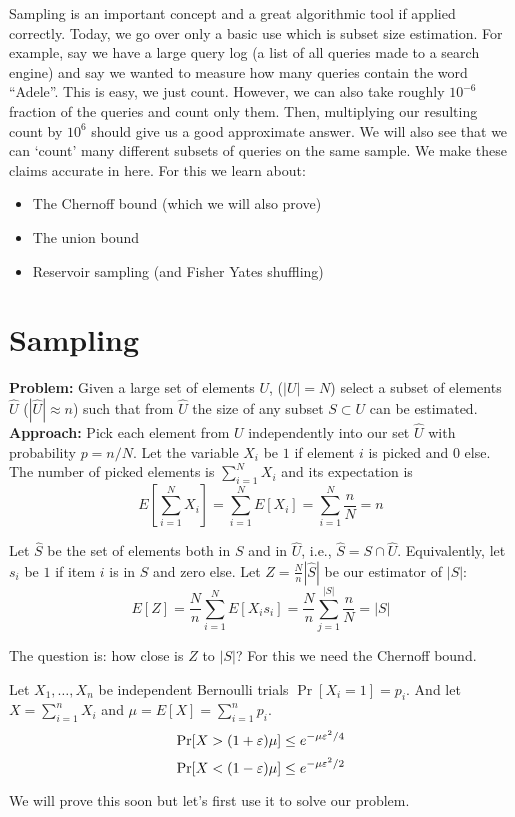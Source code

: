 \documentclass{article}
\begin{document}

Sampling is an important concept and a great algorithmic tool if applied correctly.
Today, we go over only a basic use which is subset size estimation.
For example, say we have a large query log (a list of all queries made to a search engine)
and say we wanted to measure how many queries contain the word ``Adele''.
This is easy, we just count. 
However, we can also take roughly $10^{-6}$ fraction of the queries and count only them.
Then, multiplying our resulting count by $10^{6}$ should give us a good approximate answer.
We will also see that we can `count' many different subsets of queries on the same sample.
We make these claims accurate in here.
For this we learn about:
\begin{itemize}
\item The Chernoff bound (which we will also prove)
\item The union bound 
\item Reservoir sampling (and Fisher Yates shuffling)
\end{itemize}

\section{Sampling}

{\bf Problem:} Given a large set of elements $U$, ($|U|=N$) select a subset of elements 
$\hat{U}$ ($|\hat{U}| \approx n$) such that from 
$\hat{U}$ the size of any subset $S \subset U$ can be estimated.\\
{\bf Approach:} Pick each element from $U$ independently into our set $\hat{U}$ with probability $p = n/N$.
Let the variable $X_i$ be $1$ if element $i$ is picked and $0$ else.
The number of picked elements is $\sum_{i=1}^{N} X_i$ and its expectation is 
$$E[\sum_{i=1}^{N} X_i] = \sum_{i=1}^{N}E[X_i] = \sum_{i=1}^{N}\frac{n}{N} = n$$

Let $\hat{S}$ be the set of elements both in $S$ and in $\hat{U}$, i.e., $\hat{S} =  S \cap \hat{U}$. 
Equivalently, let $s_i$ be $1$ if item $i$ is in $S$ and zero else. 
Let $Z = \frac{N}{n}|\hat{S}|$ be our estimator of $|S|$:
\[
E[Z] = \frac{N}{n}\sum_{i=1}^{N}E[X_i s_i] = \frac{N}{n}\sum_{j=1}^{|S|} \frac{n}{N} =  |S|
\]

\noindent The question is: how close is $Z$ to $|S|$? For this we need the Chernoff bound.

\begin{lemma}
Let $X_1,\ldots,X_n$ be independent Bernoulli trials $\Pr[X_i=1] = p_i$. 
And let $X = \sum_{i=1}^{n}X_i$ and $\mu = E[X] = \sum_{i=1}^{n}p_i$.
\begin{equation}
\Pr[X > (1 + \varepsilon)\mu] \le e^{-\mu \varepsilon^2/4}
\end{equation} 
\begin{equation}
\Pr[X < (1 - \varepsilon)\mu] \le e^{-\mu \varepsilon^2/2}
\end{equation} 
\end{lemma}
We will prove this soon but let's first use it to solve our problem.
\end{document}
